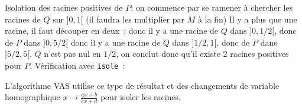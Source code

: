 \documentclass[a4paper,11pt]{book}
\begin{document}
\begin{giacjshere}
\begin{itemize}
Isolation des racines positives de $P$: 
on commence par se ramener \`a chercher les racines
de $Q$ sur $]0,1[$ (il faudra les multiplier par $M$ \`a la fin)
Il y a plus que une racine, il faut d\'ecouper en deux~:
donc il y a une racine de $Q$ dans $]0,1/2[$, donc de $P$ dans $]0,5/2[$
donc il y a une racine de $Q$ dans $]1/2,1[$, donc de $P$ dans $]5/2,5[$.
$Q$ n'est pas nul en $1/2$, on conclut donc qu'il existe 2 racines positives
pour $P$. V\'erification avec {\tt isole}~:

L'algorithme VAS utilise ce type de r\'esultat et des changements de variable
homographique $x \rightarrow \frac{ax+b}{cx+d}$ pour isoler les racines.


\end{itemize}
\end{giacjshere}
\end{document}
